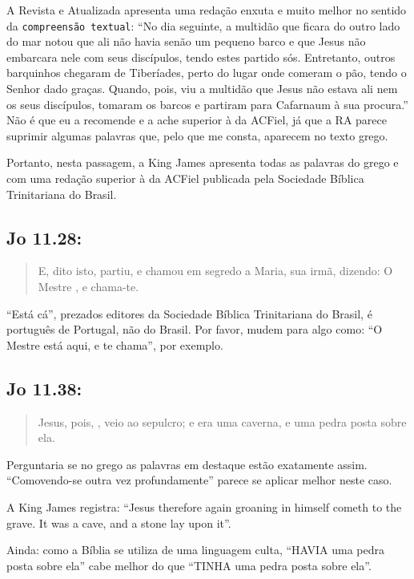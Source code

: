 A Revista e Atualizada apresenta uma redação enxuta e muito melhor no
sentido da \texttt{compreensão textual}: ``No dia seguinte, a multidão que
ficara do outro lado do mar notou que ali não havia senão um pequeno
barco e que Jesus não embarcara nele com seus discípulos, tendo estes
partido sós. Entretanto, outros barquinhos chegaram de Tiberíades,
perto do lugar onde comeram o pão, tendo o Senhor dado graças. Quando,
pois, viu a multidão que Jesus não estava ali nem os seus discípulos,
tomaram os barcos e partiram para Cafarnaum à sua procura.'' Não é que
eu a recomende e a ache superior à da ACFiel, já que a RA parece
suprimir algumas palavras que, pelo que me consta, aparecem no texto
grego.

Portanto, nesta passagem, a King James apresenta todas as palavras do grego e com uma redação superior à da ACFiel publicada pela Sociedade Bíblica Trinitariana do Brasil.


\subsection{Jo 11.28:}
\begin{quote}
    \small
E, dito isto, partiu, e chamou em segredo a Maria, sua irmã, dizendo: O Mestre , e chama-te.
\end{quote}

``Está cá'', prezados editores da Sociedade Bíblica Trinitariana do
Brasil, é português de Portugal, não do Brasil. Por favor, mudem para
algo como: ``O Mestre está aqui, e te chama'', por exemplo.

\subsection{Jo 11.38:}
\begin{quote}
    \small
Jesus, pois, , veio ao sepulcro; e era uma caverna, e  uma pedra posta sobre ela.
\end{quote}

Perguntaria se no grego as palavras em destaque estão exatamente assim. ``Comovendo-se outra vez profundamente'' parece se aplicar melhor neste caso.

A  King James registra: ``Jesus therefore again groaning in himself cometh to the grave. It was a cave, and a stone lay upon it''.

Ainda: como a Bíblia se utiliza de uma linguagem culta, ``HAVIA uma pedra posta sobre ela'' cabe melhor do que ``TINHA uma pedra posta sobre ela''.

